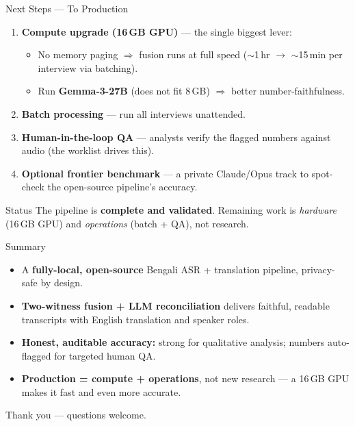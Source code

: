\documentclass[aspectratio=169,10pt]{beamer}
\begin{document}
\begin{frame}{Next Steps --- To Production}
  \begin{enumerate}\small
    \item \textbf{Compute upgrade (16\,GB GPU)} --- the single biggest lever:
      \begin{itemize}\footnotesize
        \item No memory paging $\Rightarrow$ fusion runs at full speed
              ($\sim$1\,hr $\to$ $\sim$15\,min per interview via batching).
        \item Run \textbf{Gemma-3-27B} (does not fit 8\,GB) $\Rightarrow$
              better number-faithfulness.
      \end{itemize}
    \item \textbf{Batch processing} --- run all interviews unattended.
    \item \textbf{Human-in-the-loop QA} --- analysts verify the flagged
          numbers against audio (the worklist drives this).
    \item \textbf{Optional frontier benchmark} --- a private Claude/Opus track
          to spot-check the open-source pipeline's accuracy.
  \end{enumerate}
  \vspace{0.3em}
  \begin{block}{Status}
    \small The pipeline is \textbf{complete and validated}. Remaining work is
    \emph{hardware} (16\,GB GPU) and \emph{operations} (batch + QA), not
    research.
  \end{block}
\end{frame}

\begin{frame}{Summary}
  \begin{itemize}
    \item A \textbf{fully-local, open-source} Bengali ASR + translation
          pipeline, privacy-safe by design.
    \item \textbf{Two-witness fusion + LLM reconciliation} delivers faithful,
          readable transcripts with English translation and speaker roles.
    \item \textbf{Honest, auditable accuracy:} strong for qualitative analysis;
          numbers auto-flagged for targeted human QA.
    \item \textbf{Production = compute + operations}, not new research ---
          a 16\,GB GPU makes it fast and even more accurate.
  \end{itemize}
  \vfill
  \centering\large Thank you --- questions welcome.
\end{frame}
\end{document}

